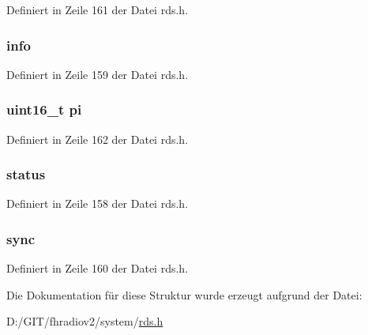 Definiert in Zeile 161 der Datei rds.\+h.

\hypertarget{structrds_a8936b68dc62d34c0bd4298d71e811a89}{}
\subsubsection[{info}]{ {\bf info}}\label{structrds_a8936b68dc62d34c0bd4298d71e811a89}


Definiert in Zeile 159 der Datei rds.\+h.

\hypertarget{structrds_ad1803744db28ac0d226ec8da9134598e}{}
\subsubsection[{pi}]{\setlength{\rightskip}{0pt plus 5cm}uint16\+\_\+t pi}\label{structrds_ad1803744db28ac0d226ec8da9134598e}


Definiert in Zeile 162 der Datei rds.\+h.

\hypertarget{structrds_a1025e6cbbd3179d2d91b9b4afb8f8efc}{}
\subsubsection[{status}]{ {\bf status}}\label{structrds_a1025e6cbbd3179d2d91b9b4afb8f8efc}


Definiert in Zeile 158 der Datei rds.\+h.

\hypertarget{structrds_aa779e41fc5dcd8e1471033612c290b23}{}
\subsubsection[{sync}]{ {\bf sync}}\label{structrds_aa779e41fc5dcd8e1471033612c290b23}


Definiert in Zeile 160 der Datei rds.\+h.



Die Dokumentation für diese Struktur wurde erzeugt aufgrund der Datei\+:\begin{DoxyCompactItemize}
\item 
D\+:/\+G\+I\+T/fhradiov2/system/\hyperlink{rds_8h}{rds.\+h}\end{DoxyCompactItemize}
